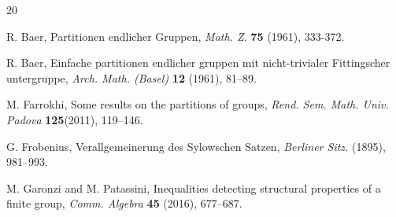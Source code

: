 \documentclass{amsart}
\theoremstyle{definition}
\numberwithin{equation}{section}
\begin{document}
\begin{thebibliography}{20}



R. Baer, Partitionen endlicher Gruppen, \textit{Math. Z.} \textbf{75} (1961),  333-372.

 R. Baer, Einfache partitionen endlicher gruppen mit nicht-trivialer Fittingscher untergruppe, \textit{Arch. Math. (Basel)} \textbf{12} (1961), 81--89.







M. Farrokhi, Some results on the partitions of groups, \textit{Rend. Sem. Math. Univ. Padova} \textbf{125}(2011), 119--146. 

 G. Frobenius, Verallgemeinerung des Sylowschen Satzen, \textit{Berliner Sitz.} (1895), 981--993.






 M. Garonzi and M. Patassini, Inequalities detecting structural properties of a finite group, \textit{Comm. Algebra} \textbf{45} (2016), 677--687.


\end{thebibliography}
\end{document}
